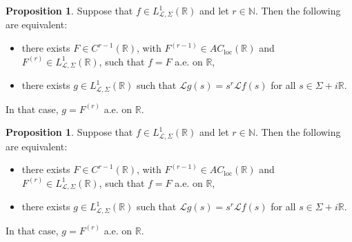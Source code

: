 \documentclass[a4paper,12pt,oneside]{article}
\theoremstyle{definition}
\newtheorem{prop}[defi]{Proposition}
\newcommand{\N}{\mathbb{N}}
\newcommand{\R}{\mathbb{R}}
\newcommand{\LT}[1]{\mathcal{L}#1}
\begin{document}
\begin{prop} \label{LT_DIFF}
    Suppose that $f\in L_{\LT{},\Sigma}^{1}(\R)$ and let $r\in\N$. Then the following are equivalent:
    \begin{itemize}
        \item[$i)$] there exists $F\in C^{r-1}(\R)$, with $F^{(r-1)}\in AC_{\text{loc}}(\R)$ and $F^{(r)}\in L_{\LT{},\Sigma}^{1}(\R)$, such that $f=F$ a.e. on $\R$,
        \item[$ii)$] there exists $g\in L_{\LT{},\Sigma}^{1}(\R)$ such that $\LT{g}(s) = s^r \LT{f}(s)$ for all $s\in\Sigma+i\R$.
    \end{itemize}
    In that case, $g=F^{(r)}$ a.e. on $\R$.
\end{prop}
\begin{prop} \label{LT_DIFF}
    Suppose that $f\in L_{\LT{},\Sigma}^{1}(\R)$ and let $r\in\N$. Then the following are equivalent:
    \begin{itemize}
        \item[$i)$] there exists $F\in C^{r-1}(\R)$, with $F^{(r-1)}\in AC_{\text{loc}}(\R)$ and $F^{(r)}\in L_{\LT{},\Sigma}^{1}(\R)$, such that $f=F$ a.e. on $\R$,
        \item[$ii)$] there exists $g\in L_{\LT{},\Sigma}^{1}(\R)$ such that $\LT{g}(s) = s^r \LT{f}(s)$ for all $s\in\Sigma+i\R$.
    \end{itemize}
    In that case, $g=F^{(r)}$ a.e. on $\R$.
\end{prop}
\end{document}
